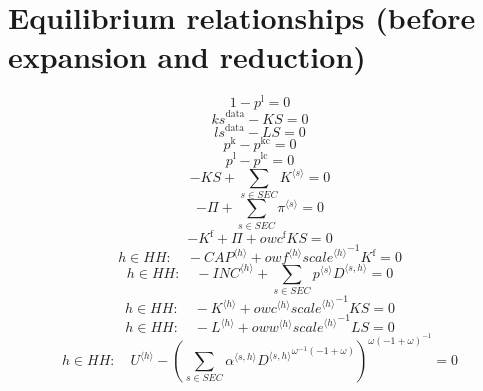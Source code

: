 \section{Equilibrium relationships (before expansion and reduction)}

\begin{equation}
1 - p^{\mathrm{l}} = 0
\end{equation}
\begin{equation}
{k\!s}^{\mathrm{data}} - {K\!S} = 0
\end{equation}
\begin{equation}
{l\!s}^{\mathrm{data}} - {L\!S} = 0
\end{equation}
\begin{equation}
p^{\mathrm{k}} - p^{\mathrm{kc}} = 0
\end{equation}
\begin{equation}
p^{\mathrm{l}} - p^{\mathrm{lc}} = 0
\end{equation}
\begin{equation}
-{K\!S} + \sum_{s\in {S\!E\!C}} {K}^{\langle s\rangle} = 0
\end{equation}
\begin{equation}
-\Pi + \sum_{s\in {S\!E\!C}} {\pi}^{\langle s\rangle} = 0
\end{equation}
\begin{equation}
-K^{\mathrm{f}} + \Pi + {{o\!w\!c}^{\mathrm{f}}} {{K\!S}} = 0
\end{equation}
\begin{equation}
h\in {H\!H}\colon\quad -{{C\!A\!P}}^{\langle h\rangle} + {{{o\!w\!f}}^{\langle h\rangle}} {{{s\!c\!a\!l\!e}}^{\langle h\rangle}}^{-1} {K^{\mathrm{f}}} = 0
\end{equation}
\begin{equation}
h\in {H\!H}\colon\quad -{{I\!N\!C}}^{\langle h\rangle} + \sum_{s\in {S\!E\!C}} {{p}^{\langle s\rangle}} {{D}^{\langle s,h\rangle}} = 0
\end{equation}
\begin{equation}
h\in {H\!H}\colon\quad -{K}^{\langle h\rangle} + {{{o\!w\!c}}^{\langle h\rangle}} {{{s\!c\!a\!l\!e}}^{\langle h\rangle}}^{-1} {{K\!S}} = 0
\end{equation}
\begin{equation}
h\in {H\!H}\colon\quad -{L}^{\langle h\rangle} + {{{o\!w\!w}}^{\langle h\rangle}} {{{s\!c\!a\!l\!e}}^{\langle h\rangle}}^{-1} {{L\!S}} = 0
\end{equation}
\begin{equation}
h\in {H\!H}\colon\quad {U}^{\langle h\rangle} - \left(\sum_{s\in {S\!E\!C}} {{\alpha}^{\langle s,h\rangle}} {{{D}^{\langle s,h\rangle}}^{{\omega}^{-1} \left(-1 + \omega\right)}}\right)^{{\omega} \left(-1 + \omega\right)^{-1}} = 0
\end{equation}
